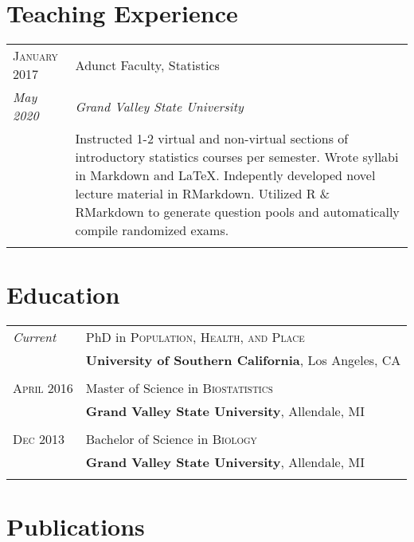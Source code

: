 \documentclass[a4paper,10pt]{article}
\begin{document}
\section{Teaching Experience}
\begin{tabular}{>{\raggedleft\arraybackslash}p{2.5cm}|p{11cm}}

 \textsc{January 2017} & Adunct Faculty, Statistics \\
 \emph{May 2020}&\emph{Grand Valley State University}\\&
 \footnotesize{Instructed 1-2 virtual and non-virtual sections of introductory statistics courses per semester. Wrote syllabi in Markdown and \LaTeX. Indepently developed novel lecture material in RMarkdown. Utilized R \& RMarkdown to generate question pools and automatically compile randomized exams. }\\\multicolumn{2}{c}{} \\

 \end{tabular}
 
 
 
 
\section{Education}
\begin{tabular}{>{\raggedleft\arraybackslash}p{2.5cm} p{11cm}}	
\emph{Current} & PhD in \textsc{Population, Health, and Place} \\
& \textbf{University of Southern California}, Los Angeles, CA \\ & \\

 \textsc{April} 2016 & Master of Science in \textsc{Biostatistics} \\
 & \textbf{Grand Valley State University}, Allendale, MI\\ & \\

 \textsc{Dec} 2013 & Bachelor of Science in \textsc{Biology} \\
 & \textbf{Grand Valley State University}, Allendale, MI\\ & \\
 
 \end{tabular}

		

	\section*{Publications}	
	
\end{document}
